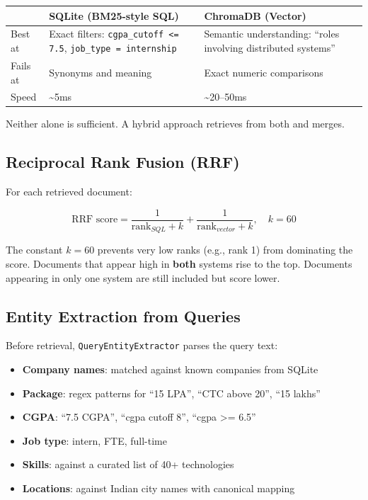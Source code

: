 \documentclass[12pt, a4paper]{article}
\begin{document}
\begin{tabularx}{\textwidth}{lXX}
\toprule
 & \textbf{SQLite (BM25-style SQL)} & \textbf{ChromaDB (Vector)} \\
\midrule
Best at & Exact filters: \texttt{cgpa\_cutoff <= 7.5}, \texttt{job\_type = internship} & Semantic understanding: ``roles involving distributed systems'' \\
Fails at & Synonyms and meaning & Exact numeric comparisons \\
Speed & \textasciitilde 5ms & \textasciitilde 20--50ms \\
\bottomrule
\end{tabularx}

Neither alone is sufficient. A hybrid approach retrieves from both and merges.

\subsection{Reciprocal Rank Fusion (RRF)}

For each retrieved document:

\[
\text{RRF score} = \frac{1}{\text{rank}_{SQL} + k} + \frac{1}{\text{rank}_{vector} + k}, \quad k = 60
\]

The constant $k = 60$ prevents very low ranks (e.g., rank 1) from dominating the score. Documents that appear high in \textbf{both} systems rise to the top. Documents appearing in only one system are still included but score lower.

\subsection{Entity Extraction from Queries}

Before retrieval, \texttt{QueryEntityExtractor} parses the query text:

\begin{itemize}[noitemsep]
    \item \textbf{Company names}: matched against known companies from SQLite
    \item \textbf{Package}: regex patterns for ``15 LPA'', ``CTC above 20'', ``15 lakhs''
    \item \textbf{CGPA}: ``7.5 CGPA'', ``cgpa cutoff 8'', ``cgpa >= 6.5''
    \item \textbf{Job type}: intern, FTE, full-time
    \item \textbf{Skills}: against a curated list of 40+ technologies
    \item \textbf{Locations}: against Indian city names with canonical mapping
\end{itemize}
\end{document}
